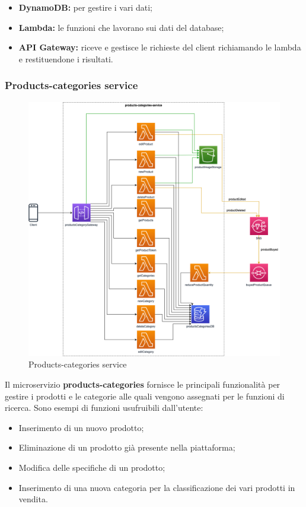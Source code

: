 \begin{itemize}
	\item \textbf{DynamoDB:} per gestire i vari dati;
	\item \textbf{Lambda:} le funzioni che lavorano sui dati del database;
	\item \textbf{API Gateway:} riceve e gestisce le richieste del client richiamando le lambda e restituendone i risultati.
\end{itemize}

\subsubsection{Products-categories service}
\begin{figure}[H]
	\centering
	\includegraphics[scale=0.4]{Immagini/Backend/AWSProductsCategories.png}
	\caption{Products-categories service}
	\label{fig:ProductCategories}
\end{figure}
Il microservizio \textbf{products-categories} fornisce le principali funzionalità per gestire i prodotti e le categorie alle quali vengono assegnati per le funzioni di ricerca. Sono esempi di funzioni usufruibili dall'utente:
\begin{itemize}
	\item Inserimento di un nuovo prodotto;
	\item Eliminazione di un prodotto già presente nella piattaforma;
	\item Modifica delle specifiche di un prodotto;
	\item Inserimento di una nuova categoria per la classificazione dei vari prodotti in vendita.
\end{itemize}\noindent

